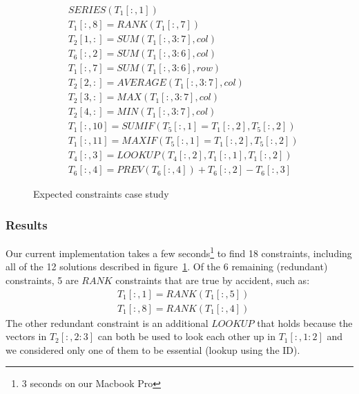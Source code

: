 \documentclass{ecai}
\newcommand{\range}[3]{\ensuremath{#1[#2,#3]}}
\newcommand{\rangeto}[2]{#1{:}#2}
\newcommand{\rangeall}{:}
\newcommand{\ecrank}[2]{\ensuremath{#1 = \mathit{RANK}(#2)}}
\begin{document}
\begin{figure}
  \label{fig:sol_example}
  {\small
    \begin{align*}
      & SERIES(\range{T_{1}}{\rangeall}{1}) \\
      & \range{T_{1}}{\rangeall}{8} = RANK(\range{T_{1}}{\rangeall}{7}) \\
      & \range{T_{2}}{1}{\rangeall} = SUM(\range{T_{1}}{\rangeall}{\rangeto{3}{7}}, col) \\
      & \range{T_{6}}{\rangeall}{2} = SUM(\range{T_{1}}{\rangeall}{\rangeto{3}{6}}, col) \\
      & \range{T_{1}}{\rangeall}{7} = SUM(\range{T_{1}}{\rangeall}{\rangeto{3}{6}}, row) \\
      & \range{T_{2}}{2}{\rangeall} = AVERAGE(\range{T_{1}}{\rangeall}{\rangeto{3}{7}}, col) \\
      & \range{T_{2}}{3}{\rangeall} = MAX(\range{T_{1}}{\rangeall}{\rangeto{3}{7}}, col) \\
      & \range{T_{2}}{4}{\rangeall} = MIN(\range{T_{1}}{\rangeall}{\rangeto{3}{7}}, col) \\
      & \range{T_{1}}{\rangeall}{10} = SUMIF(\range{T_{5}}{\rangeall}{1}=\range{T_{1}}{\rangeall}{2}, \range{T_{5}}{\rangeall}{2}) \\
      & \range{T_{1}}{\rangeall}{11} = MAXIF(\range{T_{5}}{\rangeall}{1}=\range{T_{1}}{\rangeall}{2}, \range{T_{5}}{\rangeall}{2}) \\
      & \range{T_{4}}{\rangeall}{3} = LOOKUP(\range{T_{4}}{\rangeall}{2}, \range{T_{1}}{\rangeall}{1}, \range{T_{1}}{\rangeall}{2}) \\
      & \range{T_{6}}{\rangeall}{4} = PREV(\range{T_{6}}{\rangeall}{4}) + \range{T_{6}}{\rangeall}{2} - \range{T_{6}}{\rangeall}{3}
    \end{align*}
  }
  \caption{Expected constraints case study}
\end{figure}

\subsubsection{Results}
Our current implementation takes a few seconds\footnote{3 seconds on our Macbook Pro} to find 18 constraints, including all of the 12 solutions described in figure~\ref{fig:sol_example}.
Of the 6 remaining (redundant) constraints, 5 are $\mathit{RANK}$ constraints that are true by accident, such as: \begin{align*}
  & \ecrank{\range{T_1}{\rangeall}{1}}{\range{T_1}{\rangeall}{5}} \\
  & \ecrank{\range{T_1}{\rangeall}{8}}{\range{T_1}{\rangeall}{4}}
\end{align*}
The other redundant constraint is an additional $\mathit{LOOKUP}$ that holds because the vectors in \range{T_2}{\rangeall}{\rangeto{2}{3}} can both be used to look each other up in \range{T_1}{\rangeall}{\rangeto{1}{2}} and we considered only one of them to be essential (lookup using the ID).
\end{document}
